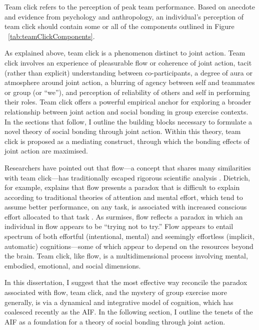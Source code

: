 \begin{CJK}{UTF8}{gbsn}
Team click refers to the perception of peak team performance.  Based on anecdote and evidence from psychology and anthropology, an individual's perception of team click should contain some or all of the components outlined in Figure ~\ref{tab:teamClickComponents}.



As explained above, team click is a phenomenon distinct to joint action.  Team click involves an experience of pleasurable flow or coherence of joint action, tacit (rather than explicit) understanding between co-participants, a degree of aura or atmosphere around joint action, a blurring of agency between self and teammates or group (or ``we''), and perception of reliability of others and self in performing their roles.  Team click offers a powerful empirical anchor for exploring a broader relationship between joint action and social bonding in group exercise contexts.  In the sections that follow, I outline the building blocks necessary to formulate a novel theory of social bonding through joint action.  Within this theory, team click is proposed as a mediating construct, through which the bonding effects of joint action are maximised.

Researchers have pointed out that flow---a concept that shares many similarities with team click---has traditionally escaped rigorous scientific analysis \citep{Dietrich2010a,Slingerland2014}.  Dietrich, for example, explains that flow presents a paradox that is difficult to explain according to traditional theories of attention and mental effort, which tend to assume better performance, on any task, is associated with increased conscious effort allocated to that task \citep{Dietrich2004b}.  As \textcite{Slingerland2014} surmises, flow reflects a paradox in which an individual in flow appears to be ``trying not to try.''  Flow appears to entail spectrum of both effortful (intentional, mental) and seemingly effortless (implicit, automatic) cognitions---some of which appear to depend on the resources beyond the brain.  Team click, like flow, is a multidimensional process involving mental, embodied, emotional, and social dimensions.

In this dissertation, I suggest that the most effective way reconcile the paradox associated with flow, team click, and the mystery of group exercise more generally, is via a dynamical and integrative model of cognition, which has coalesced recently as the AIF.  In the following section, I outline the tenets of the AIF as a foundation for a theory of social bonding through joint action.



\end{CJK}
